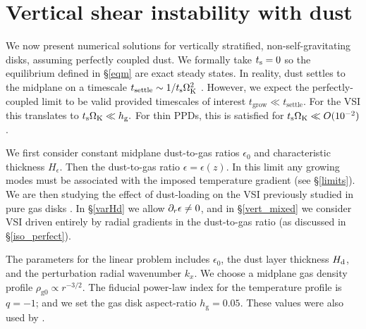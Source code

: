 \section{
  Vertical shear instability with dust}\label{results} 

We now present numerical solutions for vertically stratified,
non-self-gravitating disks, assuming perfectly coupled dust. 
We formally take $t_\mathrm{s}=0$ so the equilibrium defined in \S\ref{eqm} 
are exact steady states. In reality,   
dust settles to the midplane on a timescale $t_\mathrm{settle}\sim 
1/t_\mathrm{s}\Omega_{\rm K}^2$ \citep{takeuchi02}. However, we expect the 
perfectly-coupled limit to be valid  
provided timescales of interest $t_\mathrm{grow}\ll
t_\mathrm{settle}$. For the VSI this translates to 
 $ t_\mathrm{s}\Omega_{\rm K} \ll h_\mathrm{g}. $
For thin PPDs, this is satisfied for $t_\mathrm{s}\Omega_{\rm K} \ll O(10^{-2})$.   


We first consider constant
midplane dust-to-gas ratios $\epsilon_0$ and characteristic thickness
$H_\epsilon$. Then the dust-to-gas ratio $\epsilon=\epsilon(z)$. In 
this limit any growing modes must be associated with the imposed
temperature gradient (see \S\ref{limits}). We are then studying the
effect of dust-loading on the VSI previously studied in pure gas
disks \citep[][ in this section]{lin15}. In 
\S\ref{varHd} we allow $\partial_r\epsilon\neq 0$, and in 
\S\ref{vert_mixed} we consider VSI driven entirely by radial
gradients in the dust-to-gas ratio (as discussed in
\S\ref{iso_perfect}).  

The parameters for the linear problem includes $\epsilon_0$, the dust
layer thickness $H_\mathrm{d}$, and the perturbation radial wavenumber
$k_x$. We choose a midplane gas density profile 
$\rho_\mathrm{g0}\propto r^{-3/2}$. The fiducial power-law 
index for the temperature profile is $q=-1$; and we set the gas disk
aspect-ratio $h_\mathrm{g}=0.05$. These values were also used by  
. 

